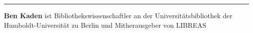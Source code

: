 \begin{center}\rule{0.5\linewidth}{\linethickness}\end{center}

\textbf{Ben Kaden} ist Bibliothekswissenschaftler an der
Universitätsbibliothek der Humboldt-Universität zu Berlin und
Mitherausgeber von LIBREAS
